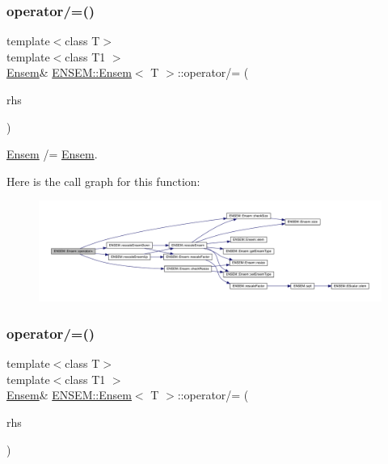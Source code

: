 \subsubsection{\texorpdfstring{operator/=()}{operator/=()}\hspace{0.1cm}{\footnotesize\ttfamily [5/6]}}
{\footnotesize\ttfamily template$<$class T$>$ \\
template$<$class T1 $>$ \\
\mbox{\hyperlink{classENSEM_1_1Ensem}{Ensem}}\& \mbox{\hyperlink{classENSEM_1_1Ensem}{E\+N\+S\+E\+M\+::\+Ensem}}$<$ T $>$\+::operator/= (\begin{DoxyParamCaption}\item[{const \mbox{\hyperlink{classENSEM_1_1Ensem}{Ensem}}$<$ T1 $>$ \&}]{rhs }\end{DoxyParamCaption})\hspace{0.3cm}{\ttfamily [inline]}}



\mbox{\hyperlink{classENSEM_1_1Ensem}{Ensem}} /= \mbox{\hyperlink{classENSEM_1_1Ensem}{Ensem}}. 

Here is the call graph for this function\+:
\nopagebreak
\begin{figure}[H]
\begin{center}
\leavevmode
\includegraphics[width=350pt]{d7/d3e/classENSEM_1_1Ensem_aa0d7f0d69f4c1c1adc551c91abcf271a_cgraph}
\end{center}
\end{figure}
\mbox{\label{classENSEM_1_1Ensem_aa0d7f0d69f4c1c1adc551c91abcf271a}} 
\subsubsection{\texorpdfstring{operator/=()}{operator/=()}\hspace{0.1cm}{\footnotesize\ttfamily [6/6]}}
{\footnotesize\ttfamily template$<$class T$>$ \\
template$<$class T1 $>$ \\
\mbox{\hyperlink{classENSEM_1_1Ensem}{Ensem}}\& \mbox{\hyperlink{classENSEM_1_1Ensem}{E\+N\+S\+E\+M\+::\+Ensem}}$<$ T $>$\+::operator/= (\begin{DoxyParamCaption}\item[{const \mbox{\hyperlink{classENSEM_1_1Ensem}{Ensem}}$<$ T1 $>$ \&}]{rhs }\end{DoxyParamCaption})\hspace{0.3cm}{\ttfamily [inline]}}



